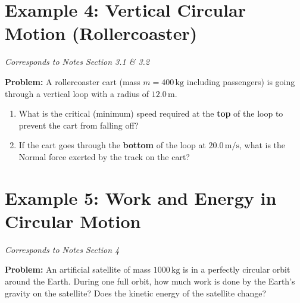 \documentclass[12pt]{article}
\begin{document}
\begin{figure}[h]
    \centering
\end{figure}

\newpage

\section*{Example 4: Vertical Circular Motion (Rollercoaster)}
\textit{Corresponds to Notes Section 3.1 \& 3.2}

\textbf{Problem:}
A rollercoaster cart (mass $m = 400 \, \text{kg}$ including passengers) is going through a vertical loop with a radius of $12.0 \, \text{m}$.
\begin{enumerate}
    \item[(a)] What is the critical (minimum) speed required at the \textbf{top} of the loop to prevent the cart from falling off?
    \item[(b)] If the cart goes through the \textbf{bottom} of the loop at $20.0 \, \text{m/s}$, what is the Normal force exerted by the track on the cart?
\end{enumerate}

\newpage

\section*{Example 5: Work and Energy in Circular Motion}
\textit{Corresponds to Notes Section 4}

\textbf{Problem:}
An artificial satellite of mass $1000 \, \text{kg}$ is in a perfectly circular orbit around the Earth. During one full orbit, how much work is done by the Earth's gravity on the satellite? Does the kinetic energy of the satellite change?

\vspace{8cm}
\end{document}
